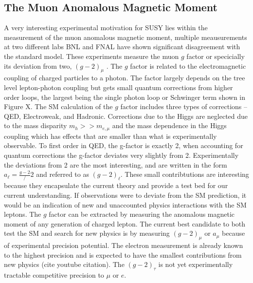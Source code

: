 \subsection{The Muon Anomalous Magnetic Moment}

A very interesting experimental motivation for SUSY lies within the measurement of the muon anomalous magnetic moment, multiple meausurements at two different labs BNL and FNAL have shown significant disagreement with the standard model. These experiments measure the muon $g$ factor or specicially its deviation from two, $(g-2)_\mu$ .  The $g$ factor is related to the electromagnetic coupling of charged particles to a photon. The factor largely depends on the tree level lepton-photon coupling but gets small quantum corrections from higher order loops, the largest being the single photon loop or Schwinger term shown in Figure X. The SM calculation of the $g$ factor includes three types of corrections -- QED, Electroweak, and Hadronic. Corrections due to the Higgs are neglected due to the mass disparity $m_h >> m_{e,\mu}$ and the mass dependence in the Higgs coupling which has effects that are smaller than what is experimentally observable. To first order in QED, the g-factor is exactly 2, when accounting for quantum corrections the g-factor deviates very slightly from 2. Experimentally the deviations from 2 are the most interesting, and are written in the form $a_\ell = \frac{g-2}/2$ and referred to as $(g-2)_\ell$. These small contribtutions are interesting because they encapsulate the current theory and provide a test bed for our current understanding.  If observations were to deviate from the SM prediction, it would be an indication of new and unaccounted physics interactions with the SM leptons. The $g$ factor can be extracted by measuring the anomalous magnetic moment of any generation of charged lepton.  The current best candidate to both test the SM and search for new physics is by measuring $(g-2)_\mu$ or $a_\mu$ because of  experimental precision potential. The electron measurement is already known to the highest precision and is expected to have the smallest contributions from new physics (cite youtube citation). The $(g-2)_\tau$ is not yet experimentally tractable competitive precision to $\mu$ or $e$.%
